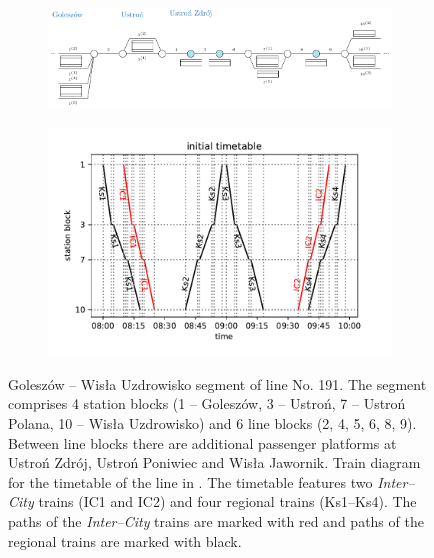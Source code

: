 \begin{figure}
  \begin{subfigure}{\textwidth}
    \caption{}\label{fig:linelarge:line}
    \includegraphics[width=\textwidth]{figures/line.pdf}
  \end{subfigure}
  \begin{subfigure}{\textwidth}
    \caption{}\label{fig:linelarge:diagram}
    \includegraphics[width=\textwidth]{figures/train_diagram}
  \end{subfigure}
  \caption{ Goleszów -- Wisła Uzdrowisko segment of line No. 191. The segment comprises 4
    station blocks (1 -- Goleszów, 3 -- Ustroń, 7 -- Ustroń Polana, 10 -- Wisła
    Uzdrowisko) and 6 line blocks (2, 4, 5, 6, 8, 9). Between line blocks there are
    additional passenger platforms at Ustroń Zdrój, Ustroń Poniwiec and Wisła
    Jawornik.  Train diagram for the timetable of the line in .
    The timetable features two \emph{Inter--City} trains (IC1 and IC2) and four regional trains (Ks1--Ks4).
    The paths of the \emph{Inter--City} trains are marked with red and paths of the regional trains are
    marked with black.}
  \label{fig:linelarge}
\end{figure}

